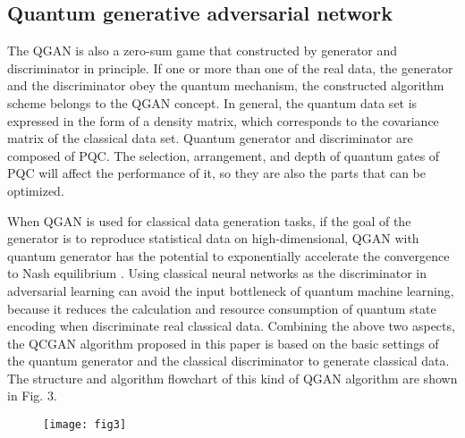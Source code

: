 \documentclass{bmcart}
\begin{document}
\subsection{Quantum generative adversarial network}
The QGAN is also a zero-sum game that constructed by generator and discriminator in principle. If one or more than one of the real data, the generator and the discriminator obey the quantum mechanism, the constructed algorithm scheme belongs to the QGAN concept. In general, the quantum data set is expressed in the form of a density matrix, which corresponds to the covariance matrix of the classical data set. Quantum generator and discriminator are composed of PQC. The selection, arrangement, and depth of quantum gates of PQC will affect the performance of it, so they are also the parts that can be optimized.


When QGAN is used for classical data generation tasks, if the goal of the generator is to reproduce statistical data on high-dimensional, QGAN with quantum generator has the potential to exponentially accelerate the convergence to Nash equilibrium \cite{Seth}. Using classical neural networks as the discriminator in adversarial learning can avoid the input bottleneck of quantum machine learning, because it reduces the calculation and resource consumption of quantum state encoding when discriminate real classical data. Combining the above two aspects, the QCGAN algorithm proposed in this paper is based on the basic settings of the quantum generator and the classical discriminator to generate classical data. The structure and algorithm flowchart of this kind of QGAN algorithm are shown in Fig. 3.

  \begin{figure}[h!]
  \texttt{[image: fig3]}
  \caption{}
      \end{figure}
\end{document}
